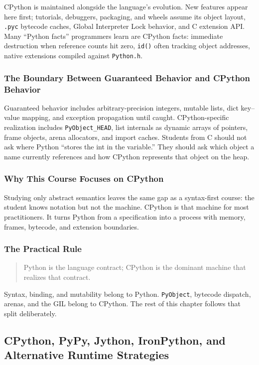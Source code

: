 \documentclass[a4paper,twoside]{report}
\begin{document}
CPython is maintained alongside the language's evolution. New features appear here first; tutorials, debuggers, packaging, and wheels assume its object layout, \texttt{.pyc} bytecode caches, Global Interpreter Lock behavior, and C extension API. Many ``Python facts'' programmers learn are CPython facts: immediate destruction when reference counts hit zero, \texttt{id()} often tracking object addresses, native extensions compiled against \texttt{Python.h}.

\subsubsection{The Boundary Between Guaranteed Behavior and CPython Behavior}

Guaranteed behavior includes arbitrary-precision integers, mutable lists, dict key--value mapping, and exception propagation until caught. CPython-specific realization includes \texttt{PyObject\_HEAD}, list internals as dynamic arrays of pointers, frame objects, arena allocators, and import caches. Students from C should not ask where Python ``stores the int in the variable.'' They should ask which object a name currently references and how CPython represents that object on the heap.

\subsubsection{Why This Course Focuses on CPython}

Studying only abstract semantics leaves the same gap as a syntax-first course: the student knows notation but not the machine. CPython is that machine for most practitioners. It turns Python from a specification into a process with memory, frames, bytecode, and extension boundaries.

\subsubsection{The Practical Rule}

\begin{quote}
Python is the language contract; CPython is the dominant machine that realizes that contract.
\end{quote}

Syntax, binding, and mutability belong to Python. \texttt{PyObject}, bytecode dispatch, arenas, and the GIL belong to CPython. The rest of this chapter follows that split deliberately.


\subsection{CPython, PyPy, Jython, IronPython, and Alternative Runtime Strategies}
\end{document}
